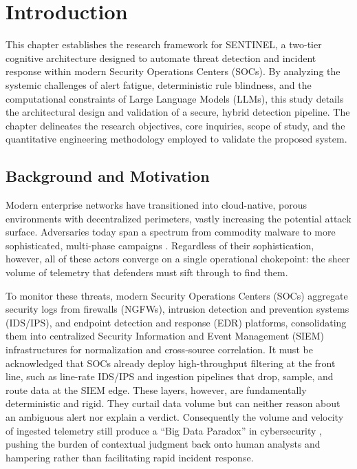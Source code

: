 \chapter{Introduction}
\label{ch:introduction}

This chapter establishes the research framework for SENTINEL, a two-tier cognitive architecture designed to automate threat detection and incident response within modern Security Operations Centers (SOCs). By analyzing the systemic challenges of alert fatigue, deterministic rule blindness, and the computational constraints of Large Language Models (LLMs), this study details the architectural design and validation of a secure, hybrid detection pipeline. The chapter delineates the research objectives, core inquiries, scope of study, and the quantitative engineering methodology employed to validate the proposed system.

\section{Background and Motivation}

Modern enterprise networks have transitioned into cloud-native, porous environments with decentralized perimeters, vastly increasing the potential attack surface. Adversaries today span a spectrum from commodity malware to more sophisticated, multi-phase campaigns \cite{ids2018}. Regardless of their sophistication, however, all of these actors converge on a single operational chokepoint: the sheer volume of telemetry that defenders must sift through to find them.

To monitor these threats, modern Security Operations Centers (SOCs) aggregate security logs from firewalls (NGFWs), intrusion detection and prevention systems (IDS/IPS), and endpoint detection and response (EDR) platforms, consolidating them into centralized Security Information and Event Management (SIEM) infrastructures \cite{siem2021} for normalization and cross-source correlation. It must be acknowledged that SOCs already deploy high-throughput filtering at the front line, such as line-rate IDS/IPS and ingestion pipelines that drop, sample, and route data at the SIEM edge. These layers, however, are fundamentally deterministic and rigid. They curtail data volume but can neither reason about an ambiguous alert nor explain a verdict. Consequently the volume and velocity of ingested telemetry still produce a ``Big Data Paradox'' in cybersecurity \cite{bigdata2019}, pushing the burden of contextual judgment back onto human analysts and hampering rather than facilitating rapid incident response.

